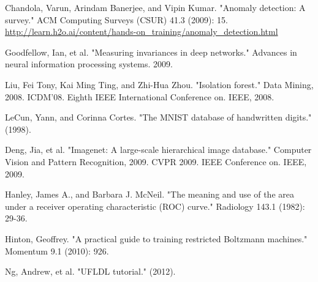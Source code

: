 \documentclass[10pt,twocolumn,letterpaper]{article}
\begin{document}

\small{
\begin{thebibliography}{1}

Chandola, Varun, Arindam Banerjee, and Vipin Kumar. "Anomaly detection: A survey." ACM Computing Surveys (CSUR) 41.3 (2009): 15.
\url{http://learn.h2o.ai/content/hands-on_training/anomaly_detection.html}

Goodfellow, Ian, et al. "Measuring invariances in deep networks." Advances in neural information processing systems. 2009.

Liu, Fei Tony, Kai Ming Ting, and Zhi-Hua Zhou. "Isolation forest." Data Mining, 2008. ICDM'08. Eighth IEEE International Conference on. IEEE, 2008.

LeCun, Yann, and Corinna Cortes. "The MNIST database of handwritten digits." (1998).

Deng, Jia, et al. "Imagenet: A large-scale hierarchical image database." Computer Vision and Pattern Recognition, 2009. CVPR 2009. IEEE Conference on. IEEE, 2009.


Hanley, James A., and Barbara J. McNeil. "The meaning and use of the area under a receiver operating characteristic (ROC) curve." Radiology 143.1 (1982): 29-36.

Hinton, Geoffrey. "A practical guide to training restricted Boltzmann machines." Momentum 9.1 (2010): 926.

Ng, Andrew, et al. "UFLDL tutorial." (2012).
\end{thebibliography}
}
\end{document}
